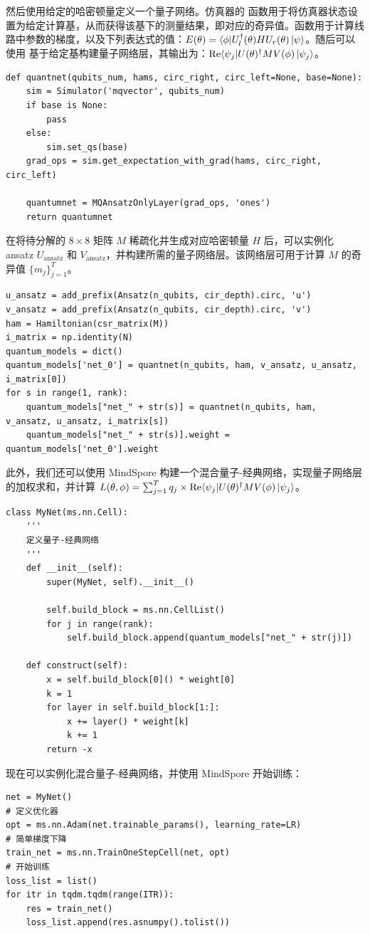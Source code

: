 然后使用给定的哈密顿量定义一个量子网络。仿真器的 \setqs 函数用于将仿真器状态设置为给定计算基，从而获得该基下的测量结果，即对应的奇异值。\getexpectationwithgrad 函数用于计算线路中参数的梯度，以及下列表达式的值：$E(\theta) = \langle\phi| U_l^{\dagger}(\theta) H U_r(\theta)\ket{\psi}$。随后可以使用 \MQAnsatzOnlyLayer 基于给定基构建量子网络层，其输出为：$\text{Re}\langle\psi_j|U(\theta)^{\dagger} M V(\phi)\ket{\psi_j}$。
\begin{lstlisting}
def quantnet(qubits_num, hams, circ_right, circ_left=None, base=None):
    sim = Simulator('mqvector', qubits_num)
    if base is None:
        pass
    else:
        sim.set_qs(base)
    grad_ops = sim.get_expectation_with_grad(hams, circ_right, circ_left)

    quantumnet = MQAnsatzOnlyLayer(grad_ops, 'ones')
    return quantumnet
\end{lstlisting}

在将待分解的 $8 \times 8$ 矩阵 $M$ 稀疏化并生成对应哈密顿量 $H$ 后，可以实例化 ansatz $U_\text{ansatz}$ 和 $V_\text{ansatz}$，并构建所需的量子网络层。该网络层可用于计算 $M$ 的奇异值 $\{m_j\}_{j=1}^T$。
\begin{lstlisting}
u_ansatz = add_prefix(Ansatz(n_qubits, cir_depth).circ, 'u')
v_ansatz = add_prefix(Ansatz(n_qubits, cir_depth).circ, 'v')
ham = Hamiltonian(csr_matrix(M))
i_matrix = np.identity(N)
quantum_models = dict()
quantum_models['net_0'] = quantnet(n_qubits, ham, v_ansatz, u_ansatz, i_matrix[0])
for s in range(1, rank):
    quantum_models["net_" + str(s)] = quantnet(n_qubits, ham, v_ansatz, u_ansatz, i_matrix[s])
    quantum_models["net_" + str(s)].weight = quantum_models['net_0'].weight
\end{lstlisting}

此外，我们还可以使用 MindSpore 构建一个混合量子-经典网络，实现量子网络层的加权求和，并计算 $L(\theta,\phi) = \sum_{j=1}^T q_j \times \text{Re} \langle\psi_j| U(\theta)^{\dagger} M V(\phi)\ket{\psi_j}$。
\begin{lstlisting}
class MyNet(ms.nn.Cell):
    '''
    定义量子-经典网络
    '''
    def __init__(self):
        super(MyNet, self).__init__()

        self.build_block = ms.nn.CellList()
        for j in range(rank):
            self.build_block.append(quantum_models["net_" + str(j)])

    def construct(self):
        x = self.build_block[0]() * weight[0]
        k = 1
        for layer in self.build_block[1:]:
            x += layer() * weight[k]
            k += 1
        return -x
\end{lstlisting}
现在可以实例化混合量子-经典网络，并使用 MindSpore 开始训练：
\begin{lstlisting}
net = MyNet()
# 定义优化器
opt = ms.nn.Adam(net.trainable_params(), learning_rate=LR)
# 简单梯度下降
train_net = ms.nn.TrainOneStepCell(net, opt)
# 开始训练
loss_list = list()
for itr in tqdm.tqdm(range(ITR)):
    res = train_net()
    loss_list.append(res.asnumpy().tolist())
\end{lstlisting}

